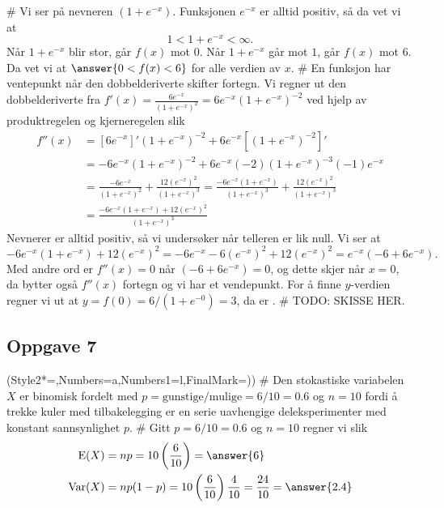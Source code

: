 \begin{easylist}[enumerate]
	# Vi ser på nevneren $(1 + e^{-x})$.
	Funksjonen $e^{-x}$ er alltid positiv, så da vet vi at
	\begin{equation*}
		1 < 1 + e^{-x} < \infty.
	\end{equation*}
	Når $1 + e^{-x}$ blir stor, går $f(x)$ mot $0$.
	Når $1 + e^{-x}$ går mot $1$, går $f(x)$ mot $6$.
	Da vet vi at $\answer{0 < f(x) < 6}$ for alle verdien av $x$.
	# En funksjon har ventepunkt når den dobbelderiverte skifter fortegn.
	Vi regner ut den dobbelderiverte fra $f'(x) = \frac{6e^{-x}}{\left(1 + e^{-x}\right)^2} = 6e^{-x} \left(1 + e^{-x}\right)^{-2} $ ved hjelp av produktregelen og kjerneregelen slik
	\begin{align*}
		f''(x) &= \left[ 6e^{-x} \right]' \left(1 + e^{-x}\right)^{-2} + 6e^{-x} \left[ \left(1 + e^{-x}\right)^{-2} \right]' \\
		&=  -6e^{-x}  \left(1 + e^{-x}\right)^{-2} + 6e^{-x} (-2)  \left(1 + e^{-x}\right)^{-3} (-1) e^{-x}  \\
		&=  \frac{-6e^{-x}}{\left(1 + e^{-x}\right)^{2}}  + \frac{12\left(e^{-x}\right)^2}{\left(1 + e^{-x}\right)^{3}} =
		 \frac{-6e^{-x} \left(1 + e^{-x}\right)}{\left(1 + e^{-x}\right)^{3}} 
		  + \frac{12\left(e^{-x}\right)^2}{\left(1 + e^{-x}\right)^{3}}\\
		 &=  \frac{-6e^{-x} \left(1 + e^{-x}\right) + 12\left(e^{-x}\right)^2}{\left(1 + e^{-x}\right)^{3}}
	\end{align*}
	Nevnerer er alltid positiv, så vi undersøker når telleren er lik null.
	Vi ser at
	\begin{equation*}
		-6e^{-x} \left(1 + e^{-x}\right) + 12\left(e^{-x}\right)^2 = 
		-6e^{-x} - 6\left(e^{-x}\right)^2 + 12\left(e^{-x}\right)^2 = 
		e^{-x} \left(-6 + 6 e^{-x}\right).
	\end{equation*}
	Med andre ord er $f''(x) = 0$ når $\left(-6 + 6 e^{-x}\right) = 0$,
	og dette skjer når $x = 0$, da bytter også $f''(x)$ fortegn og vi har et vendepunkt.
	For å finne $y$-verdien regner vi ut at $y = f(0) = 6 / (1 + e^{-0}) = 3$,
	da er .
	# TODO: SKISSE HER.
\end{easylist}

\subsection*{Oppgave 7}
\begin{easylist}[enumerate]
	\ListProperties(Style2*=,Numbers=a,Numbers1=l,FinalMark={)})
	# Den stokastiske variabelen $X$ er binomisk fordelt med $p = \text{gunstige} / \text{mulige} =  6/10 = 0.6$ og $n = 10$ fordi å trekke kuler med tilbakelegging er en serie uavhengige deleksperimenter med konstant sannsynlighet $p$.
	# Gitt $p = 6/10 = 0.6$ og $n = 10$ regner vi slik
	\begin{align*}
		\operatorname{E}(X) &= np = 10 \left(\frac{6}{10}\right) = \answer{6} \\
		\operatorname{Var}(X) &= np(1-p) = 10 \left(\frac{6}{10}\right) \frac{4}{10} = \frac{24}{10} = \answer{2.4} 
	\end{align*}
\end{easylist}

